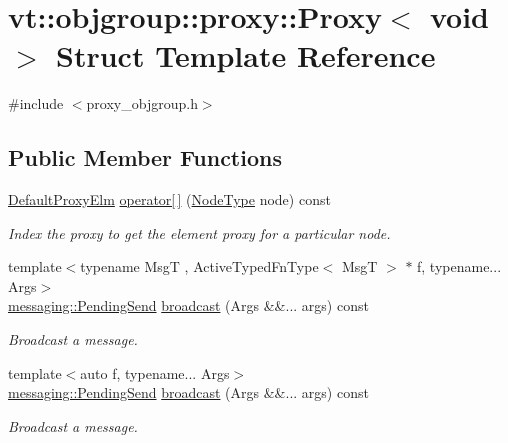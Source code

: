 \hypertarget{structvt_1_1objgroup_1_1proxy_1_1_proxy_3_01void_01_4}{}\section{vt\+:\+:objgroup\+:\+:proxy\+:\+:Proxy$<$ void $>$ Struct Template Reference}
\label{structvt_1_1objgroup_1_1proxy_1_1_proxy_3_01void_01_4}


{\ttfamily \#include $<$proxy\+\_\+objgroup.\+h$>$}

\subsection*{Public Member Functions}
\begin{DoxyCompactItemize}
\item 
\hyperlink{namespacevt_1_1objgroup_1_1proxy_ae207233400f23aa10c30217cdb369c54}{Default\+Proxy\+Elm} \hyperlink{structvt_1_1objgroup_1_1proxy_1_1_proxy_3_01void_01_4_a133d35ed66d898376ec5bb6e758183ed}{operator\mbox{[}$\,$\mbox{]}} (\hyperlink{namespacevt_a866da9d0efc19c0a1ce79e9e492f47e2}{Node\+Type} node) const
\begin{DoxyCompactList}\small\item\em Index the proxy to get the element proxy for a particular node. \end{DoxyCompactList}\item 
{\footnotesize template$<$typename MsgT , Active\+Typed\+Fn\+Type$<$ Msg\+T $>$ $\ast$ f, typename... Args$>$ }\\\hyperlink{structvt_1_1messaging_1_1_pending_send}{messaging\+::\+Pending\+Send} \hyperlink{structvt_1_1objgroup_1_1proxy_1_1_proxy_3_01void_01_4_a13f8d6751a246a449e7d13ae7eed3541}{broadcast} (Args \&\&... args) const
\begin{DoxyCompactList}\small\item\em Broadcast a message. \end{DoxyCompactList}\item 
{\footnotesize template$<$auto f, typename... Args$>$ }\\\hyperlink{structvt_1_1messaging_1_1_pending_send}{messaging\+::\+Pending\+Send} \hyperlink{structvt_1_1objgroup_1_1proxy_1_1_proxy_3_01void_01_4_aef5ca6344823e49472221126a074ca90}{broadcast} (Args \&\&... args) const
\begin{DoxyCompactList}\small\item\em Broadcast a message. \end{DoxyCompactList}\item 

\end{DoxyCompactItemize}
